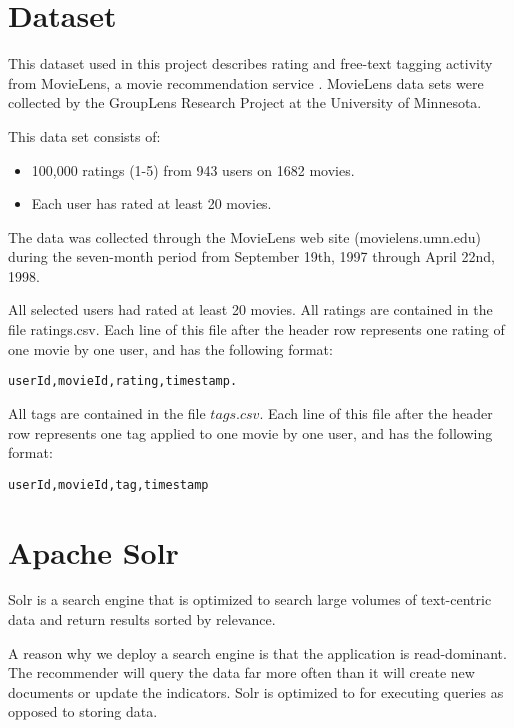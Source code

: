 \documentclass[twoside,a4paper]{article}
\begin{document}
\section{Dataset}
\label{sec:dataset}

This dataset used in this project describes rating and free-text tagging activity from MovieLens, a movie recommendation service \cite{movielensdata}.
MovieLens data sets were collected by the GroupLens Research Project at the University of Minnesota.
 
This data set consists of:
\begin{itemize}
\item 100,000 ratings (1-5) from 943 users on 1682 movies. 
\item Each user has rated at least 20 movies. 
\end{itemize}

The data was collected through the MovieLens web site (movielens.umn.edu) during the seven-month period from September 19th, 
1997 through April 22nd, 1998.

All selected users had rated at least 20 movies.
All ratings are contained in the file ratings.csv. Each line of this file after the header row represents one rating of one movie by one user, and has the following format:

\begin{verbatim}
userId,movieId,rating,timestamp.
\end{verbatim}

All tags are contained in the file $tags.csv$. Each line of this file after the header row represents one tag applied to one movie by one user, and has the following format:
\begin{verbatim}
userId,movieId,tag,timestamp
\end{verbatim}

\section{Apache Solr}
\label{sec:solr}

Solr is a search engine that is optimized to search large volumes of text-centric data and return results sorted by relevance. 

A reason why we deploy a search engine is that the application is read-dominant. The recommender will query the data far more often than it will create new documents or update the indicators. Solr is optimized to for executing queries as opposed to storing data.
\end{document}

